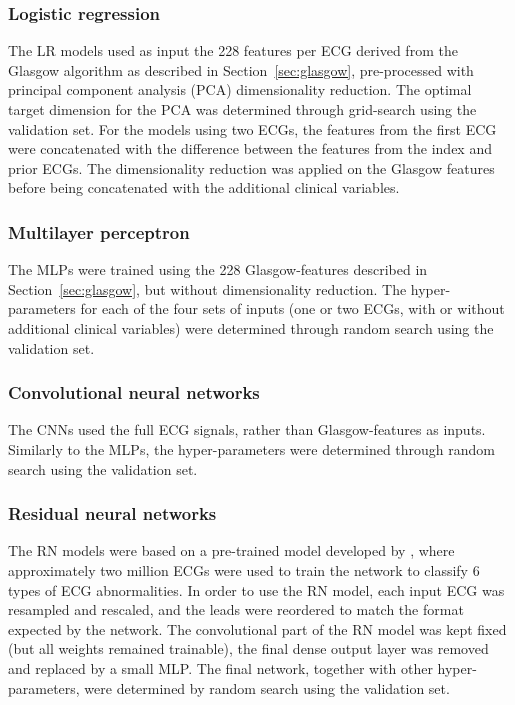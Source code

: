 \documentclass[preprint]{elsarticle}
\begin{document}
\subsubsection{Logistic regression}
The LR models used as input the 228 features per ECG derived from the Glasgow algorithm as described in Section~\ref{sec:glasgow}, pre-processed with principal component analysis (PCA) dimensionality reduction. The optimal target dimension for the PCA was determined through grid-search using the validation set. For the models using two ECGs, the features from the first ECG were concatenated with the difference between the features from the index and prior ECGs. The dimensionality reduction was applied on the Glasgow features before being concatenated with the additional clinical variables.

\subsubsection{Multilayer perceptron}
The MLPs were trained using the 228 Glasgow-features described in Section~\ref{sec:glasgow}, but without dimensionality reduction. The hyper-parameters for each of the four sets of inputs (one or two ECGs, with or without additional clinical variables) were determined through random search using the validation set.

\subsubsection{Convolutional neural networks}
The CNNs used the full ECG signals, rather than Glasgow-features as inputs. Similarly to the MLPs, the hyper-parameters were determined through random search using the validation set.

\subsubsection{Residual neural networks}
The RN models were based on a pre-trained model developed by \citet{ribeiro2020}, where approximately two million ECGs were used to train the network to classify 6 types of ECG abnormalities. In order to use the RN model, each input ECG was resampled and rescaled, and the leads were reordered to match the format expected by the network. The convolutional part of the RN model was kept fixed (but all weights remained trainable), the final dense output layer was removed and replaced by a small MLP. The final network, together with other hyper-parameters, were determined by random search using the validation set. 
\end{document}
